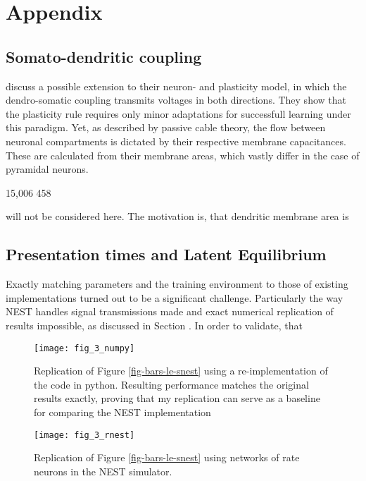 
\chapter{Appendix}



\section{Somato-dendritic coupling}\label{sec-somato-dendr}

\cite{urbanczik2014learning} discuss a possible extension to their neuron- and plasticity model, in which the
dendro-somatic coupling transmits voltages in both directions. They show that the plasticity rule requires only minor
adaptations for successfull learning under this paradigm. Yet, as described by passive cable theory, the flow between
neuronal compartments is dictated by their respective membrane capacitances. These are calculated from their membrane
areas, which vastly differ in the case of pyramidal neurons. 


15,006 458


will not be considered here. The motivation is, that dendritic membrane area is


\section{Presentation times and Latent Equilibrium}\label{sec-appendix-t-pres}

Exactly matching parameters and the training environment to those of existing implementations turned out to be a 
significant challenge. Particularly the way NEST handles signal transmissions made and exact numerical replication of
results impossible, as discussed in Section . In order to validate, that  



\begin{figure}
    \centering
    \texttt{[image: fig\_3\_numpy]}
    \caption{Replication of Figure \ref{fig-bars-le-snest} using a re-implementation of the \cite{Haider2021} code in
        python. Resulting performance matches the original results exactly, proving that my replication can serve as a
        baseline for comparing the NEST implementation}
    \label{fig-bars-le-numpy}
\end{figure}


\begin{figure}
    \centering
    \texttt{[image: fig\_3\_rnest]}
    \caption{Replication of Figure \ref{fig-bars-le-snest} using networks of rate neurons in the NEST simulator.}
    \label{fig-bars-le-rnest}
\end{figure}


